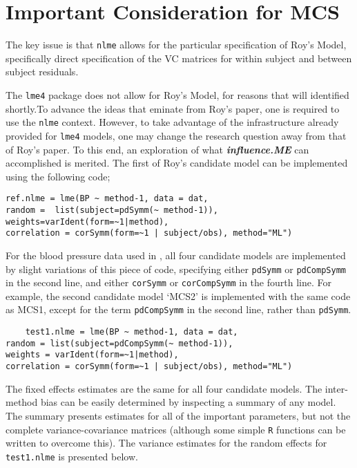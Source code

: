 \section{Important Consideration for MCS}

The key issue is that \texttt{nlme} allows for the particular specification of Roy's Model, specifically direct specification of the VC matrices for within subject and between subject residuals.

The \texttt{lme4} package does not allow for Roy's Model, for reasons that will identified shortly.To advance the ideas that eminate from Roy's paper, one is required to use the \texttt{nlme} context. However, to take advantage of the infrastructure already provided for \texttt{lme4} models, one may change the research question away from that of Roy's paper. To this end, an exploration of what \textbf{\textit{influence.ME}} can accomplished is merited. The first of Roy's candidate model can be implemented using the following code;\\

\begin{framed}
\begin{verbatim}
ref.nlme = lme(BP ~ method-1, data = dat,
random =  list(subject=pdSymm(~ method-1)),
weights=varIdent(form=~1|method),
correlation = corSymm(form=~1 | subject/obs), method="ML")
\end{verbatim}
\end{framed}

For the blood pressure data used in \citet{ARoy2009}, all four candidate models are implemented by slight variations of this piece of code, specifying either \texttt{pdSymm} or \texttt{pdCompSymm} in the second line, and either \texttt{corSymm} or \texttt{corCompSymm} in the fourth line.
For example, the second candidate model `MCS2' is implemented with the same code as MCS1, except for the term \texttt{pdCompSymm} in the second line, rather than \texttt{pdSymm}.

\begin{framed}
\begin{verbatim}
    test1.nlme = lme(BP ~ method-1, data = dat,
random = list(subject=pdCompSymm(~ method-1)),
weights = varIdent(form=~1|method),
correlation = corSymm(form=~1 | subject/obs), method="ML")
\end{verbatim}
\end{framed}

The fixed effects estimates are the same for all four candidate models. The inter-method bias can be easily determined by inspecting a summary of any model. The summary presents estimates for all of the important parameters, but not the complete variance-covariance matrices (although some simple \texttt{R} functions can be written to overcome this). The variance estimates for the random effects for \texttt{test1.nlme} is presented below.

